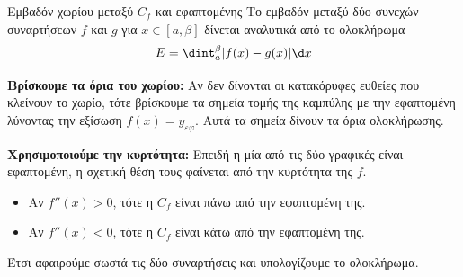\begin{askhsh}{Εμβαδόν χωρίου μεταξύ $C_f$ και εφαπτομένης}
Το εμβαδόν μεταξύ δύο συνεχών συναρτήσεων $f$ και $g$ για $x \in [a, \beta]$ δίνεται αναλυτικά από το ολοκλήρωμα \[E = \dint_a^\beta |f(x) - g(x)| \d x\]
\bhmata
\begin{bhma}
    \item \textbf{Βρίσκουμε τα όρια του χωρίου:} Αν δεν δίνονται οι κατακόρυφες ευθείες που κλείνουν το χωρίο, τότε βρίσκουμε τα σημεία τομής της καμπύλης με την εφαπτομένη λύνοντας την εξίσωση $f(x)=y_{\varepsilon\varphi}$. Αυτά τα σημεία δίνουν τα όρια ολοκλήρωσης.
    \item \textbf{Χρησιμοποιούμε την κυρτότητα:} Επειδή η μία από τις δύο γραφικές είναι εφαπτομένη, η σχετική θέση τους φαίνεται από την κυρτότητα της $f$.
    \begin{itemize}
        \item Αν $f''(x)>0$, τότε η $C_f$ είναι πάνω από την εφαπτομένη της.
        \item Αν $f''(x)<0$, τότε η $C_f$ είναι κάτω από την εφαπτομένη της.
    \end{itemize}
    Έτσι αφαιρούμε σωστά τις δύο συναρτήσεις και υπολογίζουμε το ολοκλήρωμα.
\end{bhma}
\end{askhsh}


